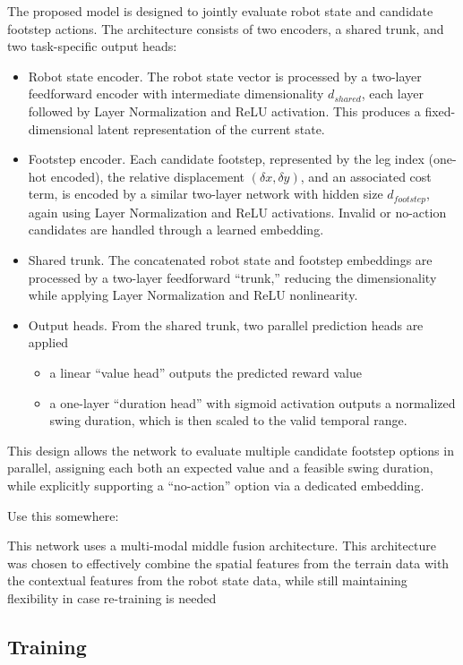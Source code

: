 The proposed model is designed to jointly evaluate robot state and
candidate footstep actions. The architecture consists of two
encoders, a shared trunk, and two task-specific output heads:
\begin{itemize}
  \item Robot state encoder. The robot state vector is processed by a
    two-layer feedforward encoder with intermediate dimensionality
    $d_{shared}$, each layer followed by Layer Normalization and ReLU
    activation.
    This produces a fixed-dimensional latent representation of the
    current state.
  \item Footstep encoder. Each candidate footstep, represented by the leg
    index (one-hot encoded), the relative displacement
    $(\delta x, \delta y)$, and an associated cost term, is encoded by a similar
    two-layer network with hidden size $d_{footstep}$, again using
    Layer Normalization and ReLU activations. Invalid or
    no-action candidates are handled through a learned embedding.
  \item Shared trunk. The concatenated robot state and footstep embeddings
    are processed by a two-layer feedforward “trunk,” reducing the
    dimensionality while applying Layer Normalization and ReLU nonlinearity.
  \item Output heads. From the shared trunk, two parallel prediction heads
    are applied

    \begin{itemize}
      \item a linear “value head” outputs the predicted reward
        value
      \item a one-layer “duration head” with sigmoid activation
        outputs a normalized swing duration, which is then scaled to the
        valid temporal range.
    \end{itemize}
\end{itemize}

This design allows the network to evaluate multiple candidate
footstep options in parallel, assigning each both an expected value
and a feasible swing duration, while explicitly supporting a
“no-action” option via a dedicated embedding.

\begin{todo}
  Use this somewhere:

  This network uses a multi-modal middle fusion
  architecture. This architecture was chosen to effectively combine the
  spatial features from the terrain data with the contextual features
  from the robot state data, while still maintaining flexibility in
  case re-training is needed \cite{feng2021deep}
\end{todo}

\subsection{Training}
